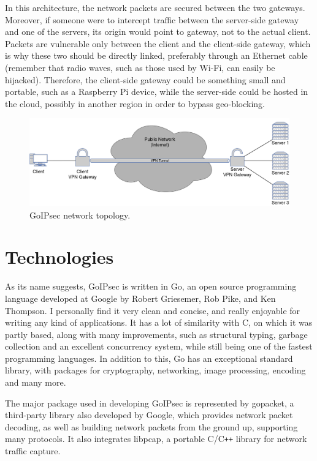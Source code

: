 \documentclass[a4paper,12pt]{report}
\begin{document}
		In this architecture, the network packets are secured between the two gateways. Moreover, if someone were to intercept traffic between the server-side gateway and one of the servers, its origin would point to gateway, not to the actual client. Packets are vulnerable only between the client and the client-side gateway, which is why these two should be directly linked, preferably through an Ethernet cable (remember that radio waves, such as those used by Wi-Fi, can easily be hijacked). Therefore, the client-side gateway could be something small and portable, such as a Raspberry Pi device, while the server-side could be hosted in the cloud, possibly in another region in order to bypass geo-blocking.
		\begin{figure}[h]
			\includegraphics[width=\textwidth]{goipsec_setup}
			\centering
			\caption{GoIPsec network topology.}
			\label{topology}
		\end{figure}
		
		\section{Technologies}
		As its name suggests, GoIPsec is written in Go, an open source programming language developed at Google by Robert Griesemer, Rob Pike, and Ken Thompson. I personally find it very clean and concise, and really enjoyable for writing any kind of applications. It has a lot of similarity with C, on which it was partly based, along with many improvements, such as structural typing, garbage collection and an excellent concurrency system, while still being one of the fastest programming languages. In addition to this, Go has an exceptional standard library, with packages for cryptography, networking, image processing, encoding and many more.
		
		The major package used in developing GoIPsec is represented by gopacket, a third-party library also developed by Google, which provides network packet decoding, as well as building network packets from the ground up, supporting many protocols. It also integrates libpcap, a portable C/C\texttt{++} library for network traffic capture.
		
\end{document}
